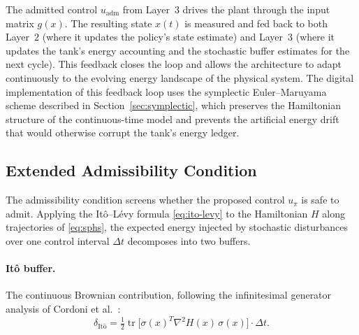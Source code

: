\documentclass[11pt]{article}
\begin{document}
The admitted control $u_{\mathrm{adm}}$ from Layer~3 drives the plant through the input
matrix $g(x)$. The resulting state $x(t)$ is measured and fed back to both Layer~2 (where
it updates the policy's state estimate) and Layer~3 (where it updates the tank's energy
accounting and the stochastic buffer estimates for the next cycle). This feedback closes the
loop and allows the architecture to adapt continuously to the evolving energy landscape of the
physical system. The digital implementation of this feedback loop uses the symplectic
Euler--Maruyama scheme described in Section~\ref{sec:symplectic}, which preserves the
Hamiltonian structure of the continuous-time model and prevents the artificial energy drift that
would otherwise corrupt the tank's energy ledger.

\subsection{Extended Admissibility Condition}
\label{sec:admissibility}

The admissibility condition screens whether the proposed control $u_\pi$ is safe to admit.
Applying the It\^{o}--L\'{e}vy formula \eqref{eq:ito-levy} to the Hamiltonian $H$ along
trajectories of \eqref{eq:sphs}, the expected energy injected by stochastic disturbances over
one control interval $\Delta t$ decomposes into two buffers.

\paragraph{It\^{o} buffer.} The continuous Brownian contribution, following the infinitesimal
generator analysis of Cordoni et al.\ \cite{cordoni2022}:
\begin{equation}
\delta_{\mathrm{It\hat{o}}} =
\tfrac{1}{2}\operatorname{tr}\!\bigl[\sigma(x)^T\nabla^2 H(x)\,\sigma(x)\bigr]\cdot\Delta t.
\label{eq:ito-buf}
\end{equation}
\end{document}
